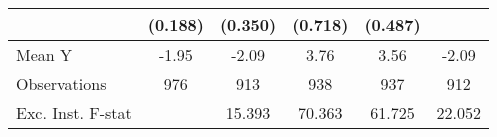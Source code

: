 {\begin{tabular}{l*{5}{c}}
            &     (0.188)         &     (0.350)         &     (0.718)         &     (0.487)         &                     \\
\midrule
Mean Y      &       -1.95         &       -2.09         &        3.76         &        3.56         &       -2.09         \\
Observations&         976         &         913         &         938         &         937         &         912         \\
Exc. Inst. F-stat&                     &      15.393         &      70.363         &      61.725         &      22.052         \\
\bottomrule
\end{tabular}
}
